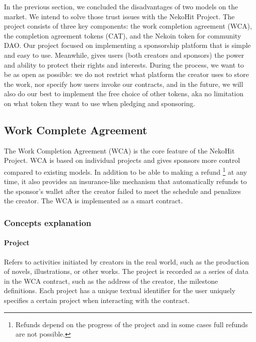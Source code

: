 In the previous section, we concluded the disadvantages of two models on the market.
We intend to solve those trust issues with the NekoHit Project.
The project consists of three key components: the work completion agreement
(WCA), the completion agreement tokens (CAT), and the Nekoin token for community DAO\@.
Our project focused on implementing a sponsorship platform that is simple and
easy to use.
Meanwhile, gives users (both creators and sponsors) the power and ability to
protect their rights and interests.
During the process, we want to be as open as possible: we do not restrict
what platform the creator uses to store the work, nor specify how users invoke
our contracts, and in the future, we will also do our best to implement the
free choice of other tokens, aka no limitation on what token they want to use
when pledging and sponsoring.

\subsection{Work Complete Agreement}\label{subsec:wca}

The Work Completion Agreement (WCA) is the core feature of the NekoHit Project.
WCA is based on individual projects and gives sponsors more control compared
to existing models.
In addition to be able to making a refund \footnote{
    Refunds depend on the progress of the project and
    in some cases full refunds are not possible.
} at any time, it also provides an insurance-like mechanism that automatically
refunds to the sponsor's wallet after the creator failed to meet the schedule
and penalizes the creator.
The WCA is implemented as a smart contract.

\subsubsection{Concepts explanation}

\paragraph{Project}

Refers to activities initiated by creators in the real world, such as the production
of novels, illustrations, or other works.
The project is recorded as a series of data in the WCA contract, such as the
address of the creator, the milestone definitions.
Each project has a unique textual identifier for the user uniquely specifies a
certain project when interacting with the contract.


